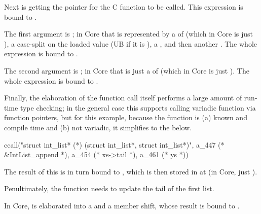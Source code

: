 
Next is getting the pointer for the C function to be called. This expression is
bound to .


The first argument is ; in Core that is represented by a
 of  (which in Core is just %
), a case-split on the loaded value (UB if it is
), a , and then another %
. The whole expression is bound to . %


The second argument is ; in Core that is just a  %
of  (which in Core is just ). The whole expression
is bound to .


Finally, the elaboration of the function call itself performs a large amount of
run-time type checking; in the general case this supports calling variadic
function via function pointers, but for this example, because the function is
(a) known and compile time and (b) not variadic, it simplifies to the below.

\begin{corecode}
ccall("struct int_list* (*) (struct int_list*, struct int_list*)",
      a_447 (* &IntList_append *),
      a_454 (* xs->tail *),
      a_461 (* ys *))
\end{corecode}

The result of this is in turn bound to , which is then
stored in at  (in Core, just ).


Penultimately, the  function needs to update the tail
of the first list.


In Core,  is elaborated into a  %
and a member shift, whose result is bound to .


